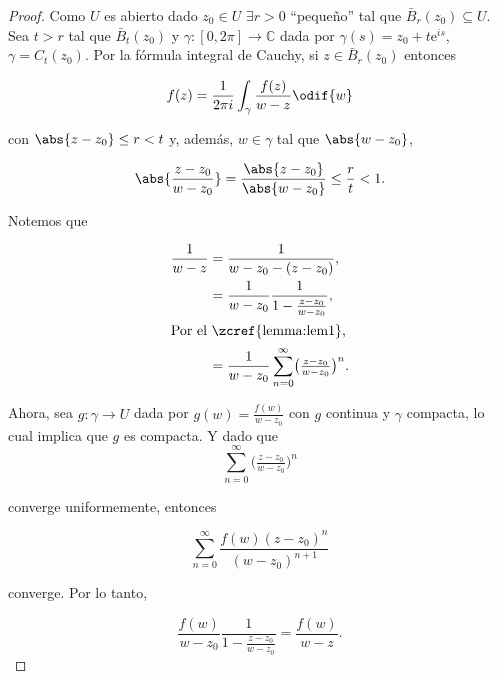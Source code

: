 \documentclass[../main.tex]{subfiles}
\begin{document}
\begin{proof}
    Como \(U\) es abierto dado \(z_{0}\in  U\) \(\exists r > 0\) ``pequeño'' tal que
    \(\bar{B}_{r}(z_{0}) \subseteq U\). Sea \(t > r\) tal que \(\bar{B}_{t}(z_{0})\) y
    \(\gamma \colon [0, 2\pi] \to \mathbb{C}\) dada por \(\gamma(s) = z_{0} + t
    \mathrm{e}^{is}\), \(\gamma = C_{t}(z_{0})\). Por la fórmula integral de Cauchy, si
    \(z\in \bar{B}_{r}(z_{0})\) entonces

    \begin{equation*}
        f(z) = \dfrac{1}{2\pi i} \int_{\gamma}^{}\dfrac{f(z)}{w - z}\odif{w}
    \end{equation*}

    con \(\abs{z - z_{0}} \leq r < t\) y, además, \(w\in \gamma\) tal que \(\abs{w -
    z_{0}}\),

    \begin{equation*}
        \abs{\dfrac{z - z_{0}}{w - z_{0}}} = \dfrac{\abs{z - z_{0}}}{\abs{w -
        z_{0}}} \leq
        \dfrac{r}{t} < 1.
    \end{equation*}

    Notemos que

    \begin{align*}
        \dfrac{1}{w - z} &= \dfrac{1}{w - z_{0} - (z - z_{0})},\\
        &= \dfrac{1}{w - z_{0}}\dfrac{1}{1 - \tfrac{z - z_{0}}{w - z_{0}}},\\
        \intertext{Por el \zcref{lemma:lem1},}
        &= \dfrac{1}{w - z_{0}}\sum_{n = 0}^{\infty}\bigl(\tfrac{z - z_{0}}{w -
        z_{0}}\bigr)^{n}.
    \end{align*}

    Ahora, sea \(g \colon \gamma \to U\) dada por \(g(w) = \tfrac{f(w)}{w - z_{0}}\) con
    \(g\) continua y \(\gamma\) compacta, lo cual implica que \(g\) es compacta.
    Y dado que
    \begin{equation*}
        \sum_{n = 0}^{\infty}\bigl(\tfrac{z - z_{0}}{w - z_{0}}\bigr)^{n}
    \end{equation*}

    converge uniformemente, entonces

    \begin{equation*}
        \sum_{n = 0}^{\infty}\dfrac{f(w)(z - z_{0})^{n}}{(w - z_{0})^{n + 1}}
    \end{equation*}

    converge. Por lo tanto,

    \begin{equation*}
        \dfrac{f(w)}{w - z_{0}}\dfrac{1}{1 - \tfrac{z - z_{0}}{w - z_{0}}} =
        \dfrac{f(w)}{w -
        z}.
    \end{equation*}


\end{proof}
\end{document}
